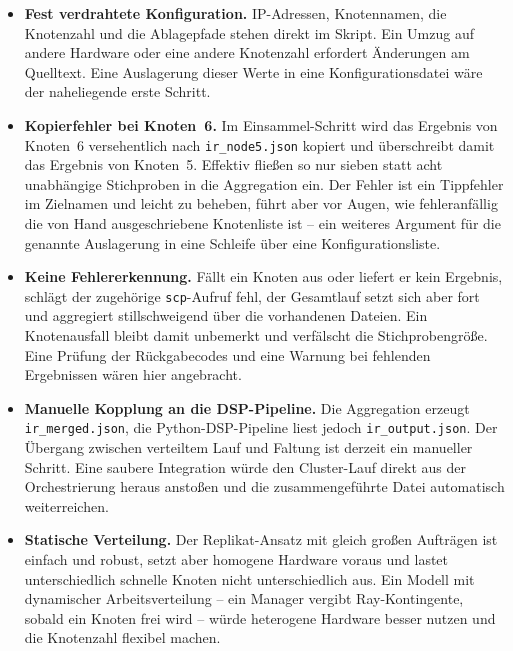 \begin{itemize}
    \item \textbf{Fest verdrahtete Konfiguration.} IP-Adressen, Knotennamen, die
    Knotenzahl und die Ablagepfade stehen direkt im Skript. Ein Umzug auf andere
    Hardware oder eine andere Knotenzahl erfordert Änderungen am Quelltext. Eine
    Auslagerung dieser Werte in eine Konfigurationsdatei wäre der naheliegende
    erste Schritt.

    \item \textbf{Kopierfehler bei Knoten~6.} Im Einsammel-Schritt wird das
    Ergebnis von Knoten~6 versehentlich nach \texttt{ir\_node5.json} kopiert und
    überschreibt damit das Ergebnis von Knoten~5. Effektiv fließen so nur sieben
    statt acht unabhängige Stichproben in die Aggregation ein. Der Fehler ist ein
    Tippfehler im Zielnamen und leicht zu beheben, führt aber vor Augen, wie
    fehleranfällig die von Hand ausgeschriebene Knotenliste ist -- ein weiteres
    Argument für die genannte Auslagerung in eine Schleife über eine
    Konfigurationsliste.

    \item \textbf{Keine Fehlererkennung.} Fällt ein Knoten aus oder liefert er kein
    Ergebnis, schlägt der zugehörige \texttt{scp}-Aufruf fehl, der Gesamtlauf setzt
    sich aber fort und aggregiert stillschweigend über die vorhandenen Dateien. Ein
    Knotenausfall bleibt damit unbemerkt und verfälscht die Stichprobengröße. Eine
    Prüfung der Rückgabecodes und eine Warnung bei fehlenden Ergebnissen wären hier
    angebracht.

    \item \textbf{Manuelle Kopplung an die DSP-Pipeline.} Die Aggregation erzeugt
    \texttt{ir\_merged.json}, die Python-DSP-Pipeline liest jedoch
    \texttt{ir\_output.json}. Der Übergang zwischen verteiltem Lauf und Faltung ist
    derzeit ein manueller Schritt. Eine saubere Integration würde den Cluster-Lauf
    direkt aus der Orchestrierung heraus anstoßen und die zusammengeführte Datei
    automatisch weiterreichen.

    \item \textbf{Statische Verteilung.} Der Replikat-Ansatz mit gleich großen
    Aufträgen ist einfach und robust, setzt aber homogene Hardware voraus und lastet
    unterschiedlich schnelle Knoten nicht unterschiedlich aus. Ein Modell mit
    dynamischer Arbeitsverteilung -- ein Manager vergibt Ray-Kontingente, sobald ein
    Knoten frei wird -- würde heterogene Hardware besser nutzen und die Knotenzahl
    flexibel machen.
\end{itemize}

